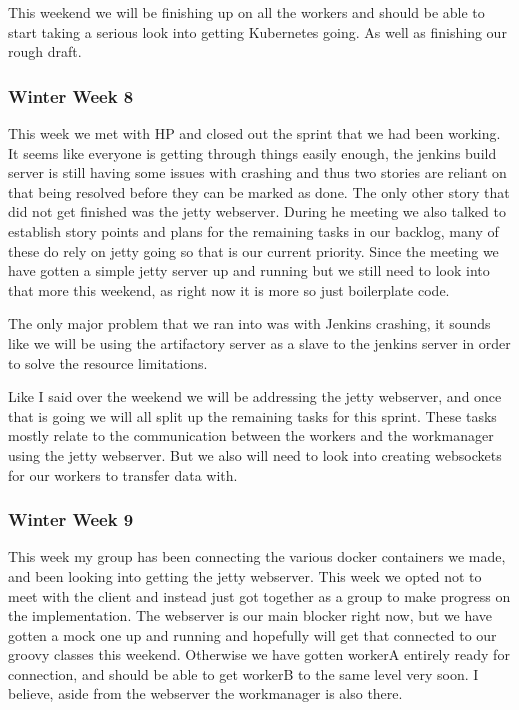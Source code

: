 \documentclass[onecolumn, draftclsnofoot,10pt, compsoc]{IEEEtran}
\begin{document}
This weekend we will be finishing up on all the workers and should be able to start taking a serious look into getting Kubernetes going. As well as finishing our rough draft.

\subsubsection*{Winter Week 8}
This week we met with HP and closed out the sprint that we had been working. It seems like everyone is getting through things easily enough, the jenkins build server is still having some issues with crashing and thus two stories are reliant on that being resolved before they can be marked as done. The only other story that did not get finished was the jetty webserver. During he meeting we also talked to establish story points and plans for the remaining tasks in our backlog, many of these do rely on jetty going so that is our current priority. Since the meeting we have gotten a simple jetty server up and running but we still need to look into that more this weekend, as right now it is more so just boilerplate code.

The only major problem that we ran into was with Jenkins crashing, it sounds like we will be using the artifactory server as a slave to the jenkins server in order to solve the resource limitations.

Like I said over the weekend we will be addressing the jetty webserver, and once that is going we will all split up the remaining tasks for this sprint. These tasks mostly relate to the communication between the workers and the workmanager using the jetty webserver. But we also will need to look into creating websockets for our workers to transfer data with.

\subsubsection*{Winter Week 9}
This week my group has been connecting the various docker containers we made, and been looking into getting the jetty webserver. This week we opted not to meet with the client and instead just got together as a group to make progress on the implementation. The webserver is our main blocker right now, but we have gotten a mock one up and running and hopefully will get that connected to our groovy classes this weekend. Otherwise we have gotten workerA entirely ready for connection, and should be able to get workerB to the same level very soon. I believe, aside from the webserver the workmanager is also there.
\end{document}
